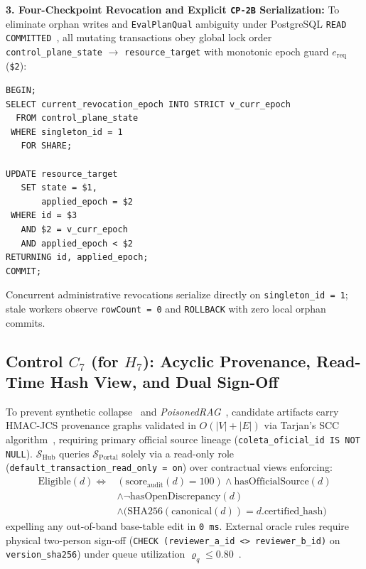 \documentclass[10pt,twocolumn]{article}
\begin{document}
\textbf{3. Four-Checkpoint Revocation and Explicit \texttt{CP-2B} Serialization:} To eliminate orphan writes and \texttt{EvalPlanQual} ambiguity under PostgreSQL \texttt{READ COMMITTED}~\cite{R03,R13}, all mutating transactions obey global lock order \texttt{control\_plane\_state} $\to$ \texttt{resource\_target} with monotonic epoch guard $e_{\mathrm{req}}$ (\texttt{\$2}):
\begin{lstlisting}
BEGIN;
SELECT current_revocation_epoch INTO STRICT v_curr_epoch
  FROM control_plane_state
 WHERE singleton_id = 1
   FOR SHARE;

UPDATE resource_target
   SET state = $1,
       applied_epoch = $2
 WHERE id = $3
   AND $2 = v_curr_epoch
   AND applied_epoch < $2
RETURNING id, applied_epoch;
COMMIT;
\end{lstlisting}
Concurrent administrative revocations serialize directly on \texttt{singleton\_id = 1}; stale workers observe \texttt{rowCount = 0} and \texttt{ROLLBACK} with zero local orphan commits.

\subsection{Control $C_7$ (for $H_7$): Acyclic Provenance, Read-Time Hash View, and Dual Sign-Off}

To prevent synthetic collapse~\cite{R23} and \emph{PoisonedRAG}~\cite{R26}, candidate artifacts carry HMAC-JCS provenance graphs validated in $O(|V| + |E|)$ via Tarjan's SCC algorithm~\cite{R02}, requiring primary official source lineage (\texttt{coleta\_oficial\_id IS NOT NULL}). $\mathcal{S}_{\mathrm{Hub}}$ queries $\mathcal{S}_{\mathrm{Portal}}$ solely via a read-only role (\texttt{default\_transaction\_read\_only = on}) over contractual views enforcing:
\begin{equation}
\begin{aligned}
\mathrm{Eligible}(d) \iff{} & (\mathrm{score}_{\mathrm{audit}}(d) = 100) \land \mathrm{hasOfficialSource}(d)\\
&\land \neg\mathrm{hasOpenDiscrepancy}(d)\\
&\land \bigl(\mathrm{SHA256}(\mathrm{canonical}(d)) = d.\mathrm{certified\_hash}\bigr)
\end{aligned}
\end{equation}
expelling any out-of-band base-table edit in \texttt{0 ms}. External oracle rules require physical two-person sign-off (\texttt{CHECK (reviewer\_a\_id <> reviewer\_b\_id)} on \texttt{version\_sha256}) under queue utilization $\varrho_q \le 0.80$~\cite{R08}.
\end{document}
